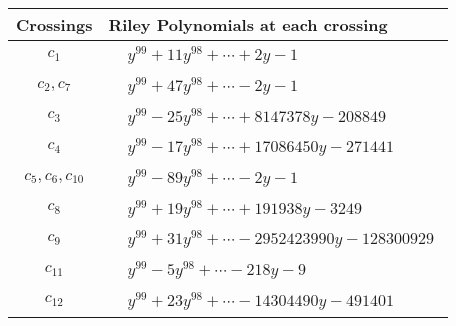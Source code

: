 \documentclass[1p]{elsarticle_modified}
\theoremstyle{definition}
\begin{document}
\begin{tabular}{m{50pt}|m{274pt}}
Crossings & \hspace{64pt}Riley Polynomials at each crossing \\
\hline $$\begin{aligned}c_{1}\end{aligned}$$&$\begin{aligned}
&y^{99}+11 y^{98}+\cdots+2 y-1
\end{aligned}$\\
\hline $$\begin{aligned}c_{2},c_{7}\end{aligned}$$&$\begin{aligned}
&y^{99}+47 y^{98}+\cdots-2 y-1
\end{aligned}$\\
\hline $$\begin{aligned}c_{3}\end{aligned}$$&$\begin{aligned}
&y^{99}-25 y^{98}+\cdots+8147378 y-208849
\end{aligned}$\\
\hline $$\begin{aligned}c_{4}\end{aligned}$$&$\begin{aligned}
&y^{99}-17 y^{98}+\cdots+17086450 y-271441
\end{aligned}$\\
\hline $$\begin{aligned}c_{5},c_{6},c_{10}\end{aligned}$$&$\begin{aligned}
&y^{99}-89 y^{98}+\cdots-2 y-1
\end{aligned}$\\
\hline $$\begin{aligned}c_{8}\end{aligned}$$&$\begin{aligned}
&y^{99}+19 y^{98}+\cdots+191938 y-3249
\end{aligned}$\\
\hline $$\begin{aligned}c_{9}\end{aligned}$$&$\begin{aligned}
&y^{99}+31 y^{98}+\cdots-2952423990 y-128300929
\end{aligned}$\\
\hline $$\begin{aligned}c_{11}\end{aligned}$$&$\begin{aligned}
&y^{99}-5 y^{98}+\cdots-218 y-9
\end{aligned}$\\
\hline $$\begin{aligned}c_{12}\end{aligned}$$&$\begin{aligned}
&y^{99}+23 y^{98}+\cdots-14304490 y-491401
\end{aligned}$\\
\hline
\end{tabular}\\~\\
\end{document}
